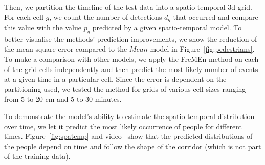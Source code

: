 Then, we partition the timeline of the test data into a spatio-temporal 3d grid.
For each cell $g$, we count the number of detections $d_g$ that occurred and compare this value with the value $p_g$ predicted by a given spatio-temporal model.
To better visualise the methods' prediction improvements, we show the reduction of the mean square error compared to the $Mean$ model in Figure~\ref{fig:pedestrians}.
To make a comparison with other models, we apply the FreMEn method on each of the grid cells independently and then predict the most likely number of events at a given time in a particular cell.
Since the error is dependent on the partitioning used, we tested the method for grids of various cell sizes ranging from 5 to 20 cm and 5 to 30 minutes.

To demonstrate the model's ability to estimate the spatio-temporal distribution over time, we let it predict the most likely occurrence of people for different times.  
Figure~\ref{fig:spatemp} and video~\cite{video} show that the predicted distributions of the people depend on time and follow the shape of the corridor (which is not part of the training data). 

